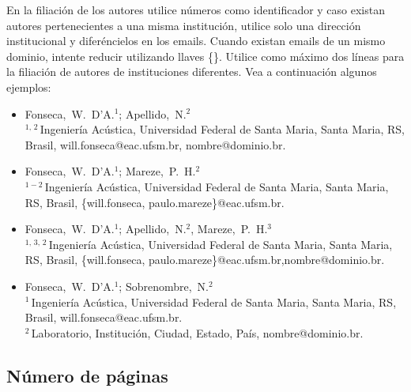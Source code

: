 \documentclass[12pt, a4paper, twoside, twocolumn]{article}
\begin{document}
En la filiación de los autores utilice números como identificador y caso existan autores pertenecientes a una misma institución, utilice solo una dirección institucional y diferéncielos en los emails. Cuando existan emails de un mismo dominio, intente reducir utilizando llaves \{\}. Utilice como máximo dos líneas para la filiación de autores de instituciones diferentes. Vea a continuación algunos ejemplos:
%
\begin{flushleft}
\vspace{-0.5\baselineskip}
\begin{itemize}[topsep=-1ex,align=left,leftmargin=0.2cm] \itemsep=4pt

	\item Fonseca,~W.~D'A.$^1$; Apellido,~N.$^2$\\[6pt]	
	$^{1,\,2}$\,Ingeniería Acústica, Universidad Federal de Santa Maria, Santa Maria, RS, Brasil,\linebreak 
	 will.fonseca@eac.ufsm.br, nombre@dominio.br.
	
	\item Fonseca,~W.~D'A.$^1$; Mareze,~P.~H.$^2$\\[6pt]	
	$^{1-2}$\,Ingeniería Acústica, Universidad Federal de Santa Maria, Santa Maria, RS, Brasil,
	\{will.fonseca, paulo.mareze\}@eac.ufsm.br.
	
	\item Fonseca,~W.~D'A.$^1$; Apellido,~N.$^2$, Mareze,~P.~H.$^3$\\[6pt]	
	$^{1,\,3,\,2}$\,Ingeniería  Acústica, Universidad Federal de Santa Maria, Santa Maria, RS, Brasil,
	\{will.fonseca, paulo.mareze\}@eac.ufsm.br,\linebreak nombre@dominio.br.

	\item Fonseca,~W.~D'A.$^1$; Sobrenombre,~N.$^2$\\[6pt]	
	$^{1}$\,Ingeniería  Acústica, Universidad Federal de Santa Maria, Santa Maria, RS, Brasil,
	will.fonseca@eac.ufsm.br.\\[4pt]		
	$^2$\,Laboratorio, Institución, Ciudad, Estado, País, nombre@dominio.br.	
\end{itemize}
\vspace{-0.4\baselineskip}
\end{flushleft}

	
\subsection{Número de páginas}
\end{document}
